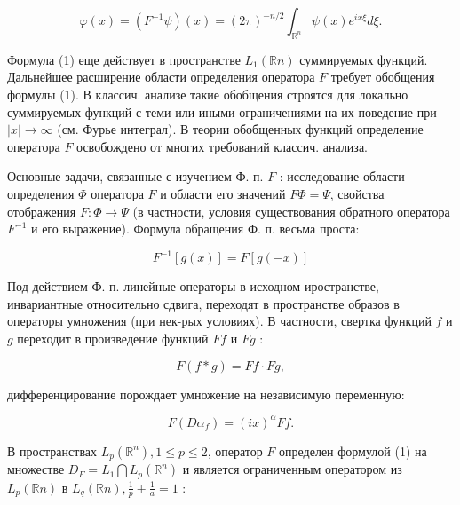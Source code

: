 \documentclass[10pt]{article}
\begin{document}
\[

\varphi(x)=\left(F^{-1} \psi\right)(x)=(2 \pi)^{-n / 2} \int_{\mathbb{R}^{n}} \psi(x) e^{i x \xi} d \xi .

\]



Формула (1) еще действует в пространстве $L_{1}(\mathbb{R} n)$ суммируемых функций. Дальнейшее расширение области определения оператора $F$ требует обобщения формулы (1). В классич. анализе такие обобщения строятся для локально суммируемых функций с теми или иными ограничениями на их поведение при $|x| \rightarrow \infty$ (см. Фурье интеграл). В теории обобщенных функций определение оператора $F$ освобождено от многих требований классич. анализа.



Основные задачи, связанные с изучением Ф. п. $F$ : исследование области определения $\Phi$ оператора $F$ и области его значений $F \Phi=\Psi$, свойства отображения $F: \Phi \rightarrow \Psi$ (в частности, условия существования обратного оператора $F^{-1}$ и его выражение). Формула обращения Ф. п. весьма проста:



\[

F^{-1}[g(x)]=F[g(-x)]

\]



Под действием Ф. п. линейные операторы в исходном иространстве, инвариантные относительно сдвига, переходят в пространстве образов в операторы умножения (при нек-рых условиях). В частности, свертка функций $f$ и $g$ переходит в произведение функций $F f$ и $F g$ :



\[

F(f * g)=F f \cdot F g,

\]



дифференцирование порождает умножение на независимую переменную:



\[

F\left(D \alpha_{f}\right)=(i x)^{\alpha} F f .

\]



В пространствах $L_{p}\left(\mathbb{R}^{n}\right), 1 \leqslant p \leqslant 2$, оператор $F$ определен формулой (1) на множестве $D_{F}=L_{1} \bigcap L_{p}\left(\mathbb{R}^{n}\right)$ и является ограниченным оператором из $L_{p}(\mathbb{R} n)$ в $L_{q}(\mathbb{R} n), \frac{1}{p}+\frac{1}{a}=1$ :
\end{document}
